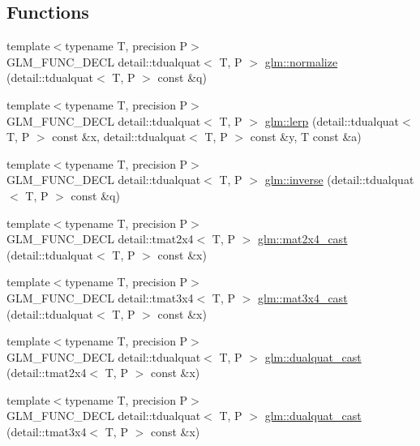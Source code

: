 \subsection*{Functions}
\begin{CompactItemize}
\item 
{\footnotesize template$<$typename T, precision P$>$ }\\GLM\_\-FUNC\_\-DECL detail::tdualquat$<$ T, P $>$ \hyperlink{group__gtc__dual__quaternion_g861508468b4982401f1ae5b4919c5678}{glm::normalize} (detail::tdualquat$<$ T, P $>$ const \&q)
\item 
{\footnotesize template$<$typename T, precision P$>$ }\\GLM\_\-FUNC\_\-DECL detail::tdualquat$<$ T, P $>$ \hyperlink{group__gtc__dual__quaternion_gfbbdf3bd28dbfe656af3d86b9c7e0cd3}{glm::lerp} (detail::tdualquat$<$ T, P $>$ const \&x, detail::tdualquat$<$ T, P $>$ const \&y, T const \&a)
\item 
{\footnotesize template$<$typename T, precision P$>$ }\\GLM\_\-FUNC\_\-DECL detail::tdualquat$<$ T, P $>$ \hyperlink{group__gtc__dual__quaternion_g793733e8cc7644ec2ff32a1007e85282}{glm::inverse} (detail::tdualquat$<$ T, P $>$ const \&q)
\item 
{\footnotesize template$<$typename T, precision P$>$ }\\GLM\_\-FUNC\_\-DECL detail::tmat2x4$<$ T, P $>$ \hyperlink{group__gtc__dual__quaternion_g5dbb18f30b7a8d6646efd9e765e04535}{glm::mat2x4\_\-cast} (detail::tdualquat$<$ T, P $>$ const \&x)
\item 
{\footnotesize template$<$typename T, precision P$>$ }\\GLM\_\-FUNC\_\-DECL detail::tmat3x4$<$ T, P $>$ \hyperlink{group__gtc__dual__quaternion_gbd9f9dad6fbec2e89d5b239b8dc37096}{glm::mat3x4\_\-cast} (detail::tdualquat$<$ T, P $>$ const \&x)
\item 
{\footnotesize template$<$typename T, precision P$>$ }\\GLM\_\-FUNC\_\-DECL detail::tdualquat$<$ T, P $>$ \hyperlink{group__gtc__dual__quaternion_gacea24f869d7e991fafcee55641595ec}{glm::dualquat\_\-cast} (detail::tmat2x4$<$ T, P $>$ const \&x)
\item 
{\footnotesize template$<$typename T, precision P$>$ }\\GLM\_\-FUNC\_\-DECL detail::tdualquat$<$ T, P $>$ \hyperlink{group__gtc__dual__quaternion_ge10828b8a3ab80fa7e9e429ebaefb9e0}{glm::dualquat\_\-cast} (detail::tmat3x4$<$ T, P $>$ const \&x)
\end{CompactItemize}


